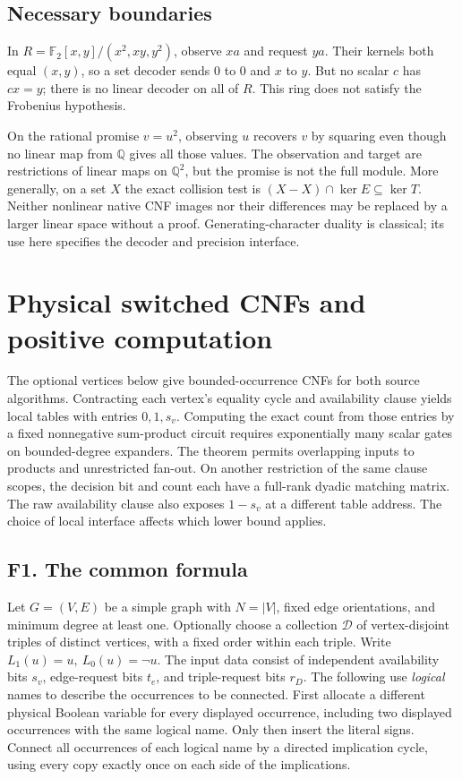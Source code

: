 \documentclass[
  11pt,
]{article}
\begin{document}
\subsection{Necessary boundaries}\label{v8-necessary-boundaries}

In \(R=\mathbb F_2[x,y]/(x^2,xy,y^2)\), observe \(xa\) and request
\(ya\). Their kernels both equal \((x,y)\), so a set decoder sends \(0\)
to \(0\) and \(x\) to \(y\). But no scalar \(c\) has \(cx=y\); there is
no linear decoder on all of \(R\). This ring does not satisfy the
Frobenius hypothesis.

On the rational promise \(v=u^2\), observing \(u\) recovers \(v\) by
squaring even though no linear map from \(\mathbb Q\) gives all those
values. The observation and target are restrictions of linear maps on
\(\mathbb Q^2\), but the promise is not the full module. More generally,
on a set \(X\) the exact collision test is
\((X-X)\cap\ker E\subseteq\ker T\). Neither nonlinear native CNF images
nor their differences may be replaced by a larger linear space without a
proof. Generating-character duality is classical; its use here specifies
the decoder and precision interface.

\section{Physical switched CNFs and positive
computation}\label{v8-section-stronger-family}

The optional vertices below give bounded-occurrence CNFs for both source
algorithms. Contracting each vertex's equality cycle and availability
clause yields local tables with entries \(0,1,s_v\). Computing the exact
count from those entries by a fixed nonnegative sum-product circuit
requires exponentially many scalar gates on bounded-degree expanders.
The theorem permits overlapping inputs to products and unrestricted
fan-out. On another restriction of the same clause scopes, the decision
bit and count each have a full-rank dyadic matching matrix. The raw
availability clause also exposes \(1-s_v\) at a different table address.
The choice of local interface affects which lower bound applies.

\subsection{F1. The common formula}\label{v8-f1.-the-common-formula}

Let \(G=(V,E)\) be a simple graph with \(N=|V|\), fixed edge
orientations, and minimum degree at least one. Optionally choose a
collection \(\mathcal D\) of vertex-disjoint triples of distinct
vertices, with a fixed order within each triple. Write
\(L_1(u)=u,\ L_0(u)=\neg u\). The input data consist of independent
availability bits \(s_v\), edge-request bits \(t_e\), and triple-request
bits \(r_D\). The following use \emph{logical} names to describe the
occurrences to be connected. First allocate a different physical Boolean
variable for every displayed occurrence, including two displayed
occurrences with the same logical name. Only then insert the literal
signs. Connect all occurrences of each logical name by a directed
implication cycle, using every copy exactly once on each side of the
implications.
\end{document}

